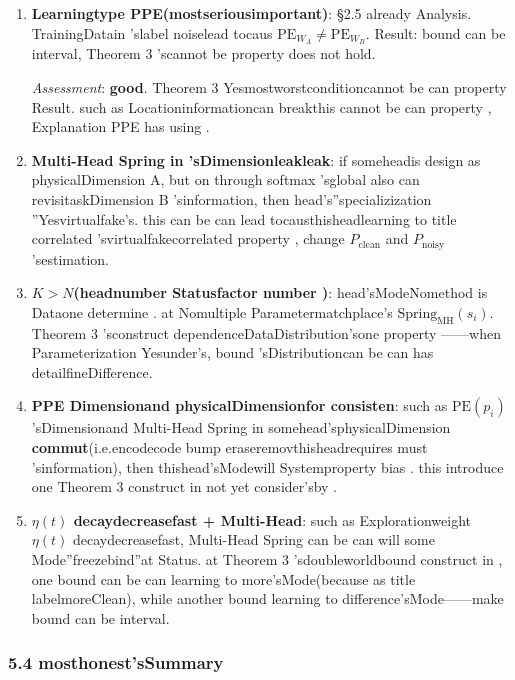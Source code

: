 \documentclass[
  12pt,
]{article}
\begin{document}
\begin{enumerate}
\def\labelenumi{\arabic{enumi}.}
\item
  \textbf{Learningtype  PPE(mostseriousimportant)}: §2.5 already Analysis. TrainingDatain 'slabel noiselead tocaus
  \(\text{PE}_{W_A} \neq \text{PE}_{W_B}\). Result: bound can be interval, Theorem
  3 'scannot be property does not hold. 

  \emph{Assessment}: \textbf{good}. Theorem 3
  Yesmostworstconditioncannot be can property Result. such as Locationinformationcan breakthis cannot be can property , Explanation PPE
  has using . 
\item
  \textbf{Multi-Head Spring in 'sDimensionleakleak}: if someheadis design as physicalDimension
  A, but on through  softmax 'sglobal also can revisitaskDimension B
  'sinformation, then head's''specializization ''Yesvirtualfake's. this can be can lead tocausthisheadlearning to title correlated 'svirtualfakecorrelated property , change 
  \(P_{\text{clean}}\) and  \(P_{\text{noisy}}\) 'sestimation. 
\item
  \textbf{\(K > N\)(headnumber Statusfactor number )}: head'sModeNomethod is Dataone determine . at Nomultiple Parametermatchplace's
  \(\text{Spring}_{\text{MH}}(s_i)\). Theorem 3
  'sconstruct dependenceDataDistribution'sone property ------when Parameterization Yesunder's, bound 'sDistributioncan be can has detailfineDifference. 
\item
  \textbf{PPE Dimensionand physicalDimensionfor consisten}: such as  \(\text{PE}(p_i)\) 'sDimensionand 
  Multi-Head Spring
  in somehead'sphysicalDimension\textbf{ commut}(i.e.encodecode bump eraseremovthisheadrequires must 'sinformation), then thishead'sModewill Systemproperty bias . this introduce one 
  Theorem 3 construct in not yet  consider'sby . 
\item
  \textbf{\(\eta(t)\) decaydecreasefast + Multi-Head}: such as Explorationweight \(\eta(t)\)
  decaydecreasefast, Multi-Head Spring can be can will some Mode''freezebind''at Status. at 
  Theorem 3
  'sdoubleworldbound construct in , one bound can be can learning to more'sMode(because as title labelmoreClean), while another bound learning to difference'sMode------make bound can be interval. 
\end{enumerate}

\subsubsection{5.4
mosthonest'sSummary}\label{ux6700ux8bdaux5b9eux7684ux603bux7ed3}
\end{document}
